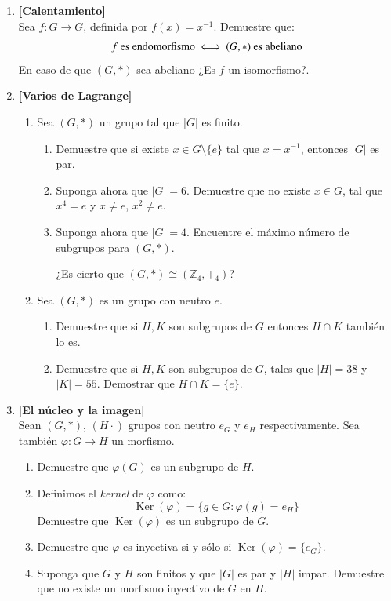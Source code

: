 \documentclass[letterpaper,10pt]{article}
\newcommand{\Z}{\mathbb Z}
\DeclareMathOperator{\Ker}{Ker}
\theoremstyle{plain}
\begin{document}
\begin{enumerate}[\bf P1.]
    \item \textbf{[Calentamiento]}\\Sea $f : G \to G$, definida por $f(x)=x^{-1}$. Demuestre que:
	$$
	\text{$f$ es endomorfismo $ \iff $ $(G,*)$ es abeliano}
	$$
	En caso de que $(G,*)$ sea abeliano ¿Es $f$ un isomorfismo?.
    \item \textbf{[Varios de Lagrange]}
        \begin{enumerate}
            \item Sea $(G,*)$ un grupo tal que $|G|$ es finito.
                \begin{enumerate}
                    \item  Demuestre que si existe $x\in G\setminus \{e\}$ tal que $x=x^{-1}$, entonces $|G|$ es par. 
                	\item   Suponga ahora que $|G|=6$. Demuestre que no existe $x\in G$, tal que $x^4=e$ y $x\neq e$, $x^2 \neq e$.
                	\item   Suponga ahora que $|G|=4$. Encuentre el máximo número de subgrupos para $(G,*)$.
                	
                	¿Es cierto que  $(G,*)\cong(\Z_4,+_4)$?
                \end{enumerate}
            \item Sea $(G,*)$ es un grupo con neutro $e$.
                \begin{enumerate}
                    \item Demuestre que si $H,K$ son subgrupos de $G$ entonces $H\cap K$ también lo es.
                    \item Demuestre que si $H,K$ son subgrupos de $G$, tales que $|H|=38$ y $|K|=55$. Demostrar que $H\cap K=\{e\}$.
                \end{enumerate}
        \end{enumerate}
    
    \item \textbf{[El núcleo y la imagen]}\\Sean $(G,*)$, $(H\cdot)$ grupos con neutro $e_G$ y $e_H$ respectivamente. Sea también $\varphi : G \to H$ un morfismo.
        \begin{enumerate}
        	\item Demuestre que $\varphi (G)$ es un subgrupo de $H$.
        	\item Definimos el \emph{kernel} de $\varphi$ como:
        	$$
        	\Ker (\varphi) = \{g \in G : \varphi(g)=e_H \}
        	$$
        	Demuestre que $\Ker (\varphi)$ es un subgrupo de $G$.
        	\item Demuestre que $\varphi$ es inyectiva si y sólo si $\Ker (\varphi) = \{ e_G \}$.
        	\item Suponga que $G$ y $H$ son finitos y que $|G|$ es par y $|H|$ impar. Demuestre que no existe un morfismo inyectivo de $G$ en $H$.
        \end{enumerate}


\end{enumerate}
\end{document}
